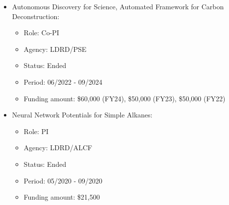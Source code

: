 \begin{itemize}
\begin{itemize}
        \item Funding amount: \$2 million (total)
        \end{itemize}
    \item Autonomous Discovery for Science, Automated Framework for Carbon Deconstruction:
        \begin{itemize}
        \item Role: Co-PI
        \item Agency: LDRD/PSE
        \item Status: Ended
        \item Period: 06/2022 - 09/2024
        \item Funding amount: \$60,000 (FY24), \$50,000 (FY23), \$50,000 (FY22)
        \end{itemize}
    \item Neural Network Potentials for Simple Alkanes:
        \begin{itemize}
        \item Role: PI
        \item Agency: LDRD/ALCF
        \item Status: Ended
        \item Period: 05/2020 - 09/2020
        \item Funding amount: \$21,500
        \end{itemize}

\end{itemize}
